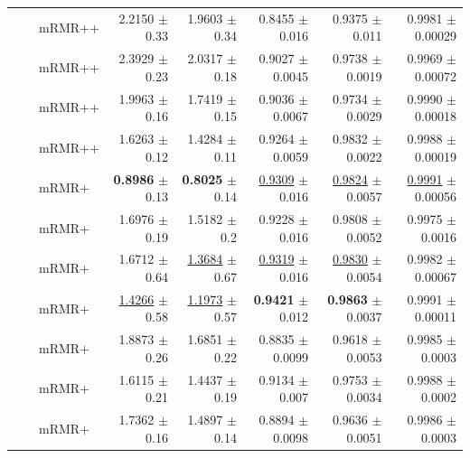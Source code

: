 \begin{longtable}{llp{}rrrrr}
 &  & mRMR++ & 2.2150 {\scriptsize $\pm$ 0.33} & 1.9603 {\scriptsize $\pm$ 0.34} & 0.8455 {\scriptsize $\pm$ 0.016} & 0.9375 {\scriptsize $\pm$ 0.011} & 0.9981 {\scriptsize $\pm$ 0.00029} \\
 &  & mRMR++ & 2.3929 {\scriptsize $\pm$ 0.23} & 2.0317 {\scriptsize $\pm$ 0.18} & 0.9027 {\scriptsize $\pm$ 0.0045} & 0.9738 {\scriptsize $\pm$ 0.0019} & 0.9969 {\scriptsize $\pm$ 0.00072} \\
 &  & mRMR++ & 1.9963 {\scriptsize $\pm$ 0.16} & 1.7419 {\scriptsize $\pm$ 0.15} & 0.9036 {\scriptsize $\pm$ 0.0067} & 0.9734 {\scriptsize $\pm$ 0.0029} & 0.9990 {\scriptsize $\pm$ 0.00018} \\
 &  & mRMR++ & 1.6263 {\scriptsize $\pm$ 0.12} & 1.4284 {\scriptsize $\pm$ 0.11} & 0.9264 {\scriptsize $\pm$ 0.0059} & 0.9832 {\scriptsize $\pm$ 0.0022} & 0.9988 {\scriptsize $\pm$ 0.00019} \\
 &  & mRMR+ & \textbf{0.8986} {\scriptsize $\pm$ 0.13} & \textbf{0.8025} {\scriptsize $\pm$ 0.14} & \underline{0.9309} {\scriptsize $\pm$ 0.016} & \underline{0.9824} {\scriptsize $\pm$ 0.0057} & \underline{0.9991} {\scriptsize $\pm$ 0.00056} \\
 &  & mRMR+ & 1.6976 {\scriptsize $\pm$ 0.19} & 1.5182 {\scriptsize $\pm$ 0.2} & 0.9228 {\scriptsize $\pm$ 0.016} & 0.9808 {\scriptsize $\pm$ 0.0052} & 0.9975 {\scriptsize $\pm$ 0.0016} \\
 &  & mRMR+ & 1.6712 {\scriptsize $\pm$ 0.64} & \underline{1.3684} {\scriptsize $\pm$ 0.67} & \underline{0.9319} {\scriptsize $\pm$ 0.016} & \underline{0.9830} {\scriptsize $\pm$ 0.0054} & 0.9982 {\scriptsize $\pm$ 0.00067} \\
 &  & mRMR+ & \underline{1.4266} {\scriptsize $\pm$ 0.58} & \underline{1.1973} {\scriptsize $\pm$ 0.57} & \textbf{0.9421} {\scriptsize $\pm$ 0.012} & \textbf{0.9863} {\scriptsize $\pm$ 0.0037} & 0.9991 {\scriptsize $\pm$ 0.00011} \\
 &  & mRMR+ & 1.8873 {\scriptsize $\pm$ 0.26} & 1.6851 {\scriptsize $\pm$ 0.22} & 0.8835 {\scriptsize $\pm$ 0.0099} & 0.9618 {\scriptsize $\pm$ 0.0053} & 0.9985 {\scriptsize $\pm$ 0.0003} \\
 &  & mRMR+ & 1.6115 {\scriptsize $\pm$ 0.21} & 1.4437 {\scriptsize $\pm$ 0.19} & 0.9134 {\scriptsize $\pm$ 0.007} & 0.9753 {\scriptsize $\pm$ 0.0034} & 0.9988 {\scriptsize $\pm$ 0.0002} \\
 &  & mRMR+ & 1.7362 {\scriptsize $\pm$ 0.16} & 1.4897 {\scriptsize $\pm$ 0.14} & 0.8894 {\scriptsize $\pm$ 0.0098} & 0.9636 {\scriptsize $\pm$ 0.0051} & 0.9986 {\scriptsize $\pm$ 0.0003} \\

\end{longtable}
